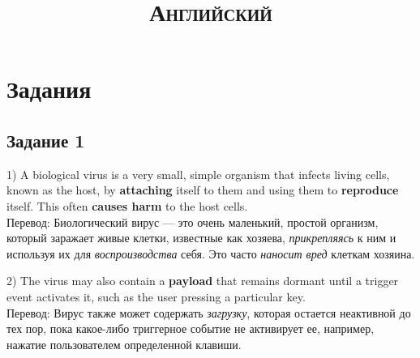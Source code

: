 

\setmainfont{Times New Roman}

\title{\textbf{\textsc{Английский}}}
\author{}
\date{} %
\linespread{1.3} %

\hypersetup{hidelinks} %

\pagestyle{fancy} %
\fancyhf{}
\rhead{\thepage} %
\renewcommand{\headrulewidth}{1pt} %


	
	\maketitle %
	\thispagestyle{empty} %
	\clearpage %
	\setcounter{page}{1} %
	\thispagestyle{empty}
	
	\renewcommand{\contentsname}{Содержание} %
	\tableofcontents\label{sec:toc}
	\clearpage
	\section{Задания}
	\subsection{Задание 1}
	\par 1) A biological virus is a very small, simple organism that infects living cells, known as the host, by \textbf{attaching} itself to them and using them to \textbf{reproduce} itself. This often \textbf{causes harm} to the host cells.
	\\
	Перевод: Биологический вирус — это очень маленький, простой организм, который заражает живые клетки, известные как хозяева, \textit{прикрепляясь} к ним и используя их для \textit{воспроизводства} себя. Это часто \textit{наносит вред} клеткам хозяина.
	
	
	\par 2) The virus may also contain a \textbf{payload} that remains dormant until a trigger event activates it, such as the user pressing a particular key.
	\\
	Перевод: Вирус также может содержать \textit{загрузку}, которая остается неактивной до тех пор, пока какое-либо триггерное событие не активирует ее, например, нажатие пользователем определенной клавиши.
	

